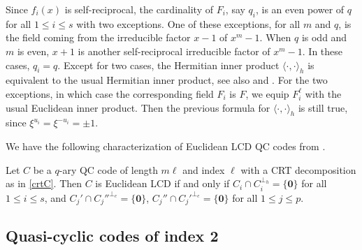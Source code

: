 \documentclass[a4paper,12pt]{article}
\begin{document}
\begin{remark} \label{remarkH} 
Since $f_i(x)$ is self-reciprocal, the cardinality of $F_i$, say $q_i$, is an even power of $q$ for all $1 \le i \le s$ with two exceptions. 
One of these exceptions, for all $m$ and $q$, is the field coming from the irreducible factor $x-1$ of $x^m-1.$ 
When $q$ is odd and $m$ is even, $x+1$ is another self-reciprocal irreducible factor of $x^m-1$. In these cases, $q_i=q$. Except for two cases,
the Hermitian inner product $\langle \cdot,\cdot \rangle_h$ is equivalent to the usual Hermitian inner product, see also \cite[p.72]{guneri2016}  and \cite[p.136]{guneri2021}.  For the two exceptions, in which case the corresponding field $F_i$ is $F$, we equip $F_i^\ell$ with the  usual Euclidean inner product. Then the previous formula for $\langle \cdot,\cdot \rangle_h$ is still true, since $\xi^{u_i}=\xi^{-u_i}=\pm1$.


\end{remark}

 
We have the following characterization of Euclidean LCD QC codes from \cite[Theorem 7.3.6]{guneri2021}.

\begin{theorem} \label{qclcd} Let $C$ be a $q$-ary QC code of length $m\ell$ and index $\ell$ with a CRT decomposition as in \eqref{crtC}.
Then $C$ is Euclidean LCD if and only if 
$C_i \cap C_i^{\perp_h} = \{\mathbf{0}\}$ for all $1 \le i \le s$, and $C_j' \cap C_j''^{\perp_e} = \{\mathbf{0}\}$, $C_j'' \cap C_j'^{\perp_e} = \{\mathbf{0}\}$ 
for all $1\le j \le p$. 
 \end{theorem}



 
\subsection{Quasi-cyclic codes of index 2}
\end{document}
